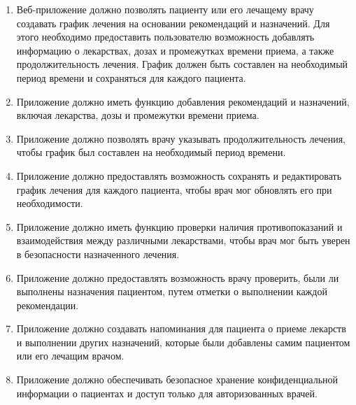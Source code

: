         \begin{enumerate}
            \item Веб-приложение должно позволять пациенту или его %
            лечащему врачу создавать график лечения на основании %
            рекомендаций и назначений. Для этого необходимо предоставить %
            пользователю возможность добавлять информацию о лекарствах, %
            дозах и промежутках времени приема, а также продолжительность %
            лечения. График должен быть составлен на необходимый период %
            времени и сохраняться для каждого пациента.
            
            \item Приложение должно иметь функцию добавления %
            рекомендаций и назначений, включая лекарства, %
            дозы и промежутки времени приема.

            \item Приложение должно позволять врачу указывать %
            продолжительность лечения, чтобы график был составлен %
            на необходимый период времени.

            \item Приложение должно предоставлять возможность %
            сохранять и редактировать график лечения для каждого %
            пациента, чтобы врач мог обновлять его при необходимости.

            \item Приложение должно иметь функцию проверки наличия %
            противопоказаний и взаимодействия между различными %
            лекарствами, чтобы врач мог быть уверен в безопасности %
            назначенного лечения.

            \item Приложение должно предоставлять возможность %
            врачу проверить, были ли выполнены назначения пациентом, %
            путем отметки о выполнении каждой рекомендации.

            \item Приложение должно создавать напоминания для пациента %
            о приеме лекарств и выполнении других назначений, %
            которые были добавлены самим пациентом или его лечащим врачом.

            \item Приложение должно обеспечивать безопасное хранение %
            конфиденциальной информации о пациентах и доступ только %
            для авторизованных врачей.
        \end{enumerate}


